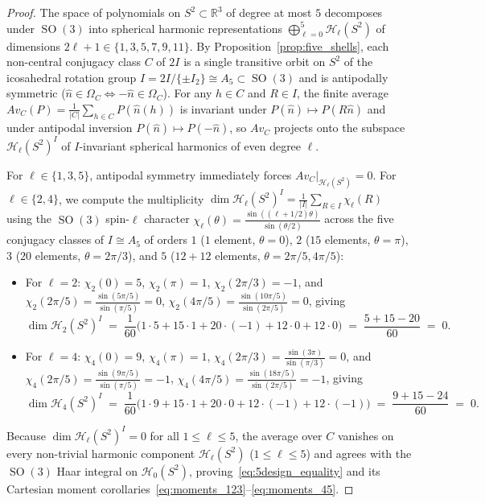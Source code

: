 \documentclass[11pt,a4paper]{article}
\theoremstyle{definition}
\theoremstyle{remark}
\newcommand{\R}{\mathbb{R}}
\newcommand{\SO}{\operatorname{SO}}
\begin{document}
\begin{proof}
The space of polynomials on $S^2 \subset \R^3$ of degree at most $5$ decomposes under $\SO(3)$ into spherical harmonic representations $\bigoplus_{\ell=0}^5 \mathcal{H}_\ell(S^2)$ of dimensions $2\ell + 1 \in \{1, 3, 5, 7, 9, 11\}$. By Proposition~\ref{prop:five_shells}, each non-central conjugacy class $C$ of $2I$ is a single transitive orbit on $S^2$ of the icosahedral rotation group $I = 2I / \{\pm I_2\} \cong A_5 \subset \SO(3)$ and is antipodally symmetric ($\hat{n} \in \Omega_C \iff -\hat{n} \in \Omega_C$). For any $h \in C$ and $R \in I$, the finite average $Av_C(P) = \frac{1}{|C|}\sum_{h\in C} P(\hat{n}(h))$ is invariant under $P(\hat{n}) \mapsto P(R\hat{n})$ and under antipodal inversion $P(\hat{n}) \mapsto P(-\hat{n})$, so $Av_C$ projects onto the subspace $\mathcal{H}_\ell(S^2)^I$ of $I$-invariant spherical harmonics of even degree $\ell$.

For $\ell \in \{1, 3, 5\}$, antipodal symmetry immediately forces $Av_C|_{\mathcal{H}_\ell(S^2)} = 0$. For $\ell \in \{2, 4\}$, we compute the multiplicity $\dim \mathcal{H}_\ell(S^2)^I = \frac{1}{|I|}\sum_{R \in I} \chi_\ell(R)$ using the $\SO(3)$ spin-$\ell$ character $\chi_\ell(\theta) = \frac{\sin((\ell + 1/2)\theta)}{\sin(\theta/2)}$ across the five conjugacy classes of $I \cong A_5$ of orders $1$ ($1$ element, $\theta=0$), $2$ ($15$ elements, $\theta=\pi$), $3$ ($20$ elements, $\theta=2\pi/3$), and $5$ ($12+12$ elements, $\theta=2\pi/5, 4\pi/5$):
\begin{itemize}
    \item For $\ell = 2$: $\chi_2(0) = 5$, $\chi_2(\pi) = 1$, $\chi_2(2\pi/3) = -1$, and $\chi_2(2\pi/5) = \frac{\sin(5\pi/5)}{\sin(\pi/5)} = 0$, $\chi_2(4\pi/5) = \frac{\sin(10\pi/5)}{\sin(2\pi/5)} = 0$, giving
    \[
    \dim \mathcal{H}_2(S^2)^I \;=\; \frac{1}{60}\bigl(1\cdot 5 + 15\cdot 1 + 20\cdot(-1) + 12\cdot 0 + 12\cdot 0\bigr) \;=\; \frac{5 + 15 - 20}{60} \;=\; 0.
    \]
    \item For $\ell = 4$: $\chi_4(0) = 9$, $\chi_4(\pi) = 1$, $\chi_4(2\pi/3) = \frac{\sin(3\pi)}{\sin(\pi/3)} = 0$, and $\chi_4(2\pi/5) = \frac{\sin(9\pi/5)}{\sin(\pi/5)} = -1$, $\chi_4(4\pi/5) = \frac{\sin(18\pi/5)}{\sin(2\pi/5)} = -1$, giving
    \[
    \dim \mathcal{H}_4(S^2)^I \;=\; \frac{1}{60}\bigl(1\cdot 9 + 15\cdot 1 + 20\cdot 0 + 12\cdot(-1) + 12\cdot(-1)\bigr) \;=\; \frac{9 + 15 - 24}{60} \;=\; 0.
    \]
\end{itemize}
Because $\dim \mathcal{H}_\ell(S^2)^I = 0$ for all $1 \le \ell \le 5$, the average over $C$ vanishes on every non-trivial harmonic component $\mathcal{H}_\ell(S^2)$ ($1 \le \ell \le 5$) and agrees with the $\SO(3)$ Haar integral on $\mathcal{H}_0(S^2)$, proving~\eqref{eq:5design_equality} and its Cartesian moment corollaries~\eqref{eq:moments_123}--\eqref{eq:moments_45}.
\end{proof}
\end{document}
